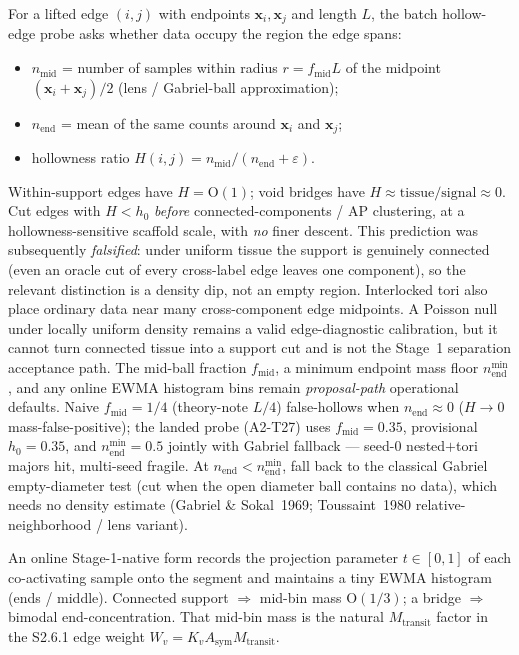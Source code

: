 \documentclass[11pt]{article}
\begin{document}
For a lifted edge $(i,j)$ with endpoints $\mathbf x_i,\mathbf x_j$ and length
$L$, the batch hollow-edge probe asks whether data occupy the region the edge
spans:
\begin{itemize}[leftmargin=1.5em]
  \item $n_{\mathrm{mid}}$ = number of samples within radius
  $r{=}f_{\mathrm{mid}}L$ of the midpoint $(\mathbf x_i+\mathbf x_j)/2$
  (lens / Gabriel-ball approximation);
  \item $n_{\mathrm{end}}$ = mean of the same counts around $\mathbf x_i$ and
  $\mathbf x_j$;
  \item hollowness ratio $H(i,j)=n_{\mathrm{mid}}/(n_{\mathrm{end}}+\varepsilon)$.
\end{itemize}
Within-support edges have $H=\mathrm{O}(1)$; void bridges have
$H\approx\mathrm{tissue}/\mathrm{signal}\approx0$. Cut edges with $H<h_0$
\emph{before} connected-components / AP clustering, at a hollowness-sensitive
scaffold scale, with \emph{no} finer descent. This prediction was subsequently
\emph{falsified}: under uniform tissue the support is genuinely connected
(even an oracle cut of every cross-label edge leaves one component), so the
relevant distinction is a density dip, not an empty region. Interlocked tori
also place ordinary data near many cross-component edge midpoints. A Poisson
null under locally uniform density remains a valid edge-diagnostic calibration,
but it cannot turn connected tissue into a support cut and is not the Stage~1
separation acceptance path. The mid-ball fraction
$f_{\mathrm{mid}}$, a minimum endpoint mass floor $n_{\mathrm{end}}^{\min}$, and
any online EWMA histogram bins remain \emph{proposal-path} operational
defaults. Naive $f_{\mathrm{mid}}{=}1/4$ (theory-note $L/4$) false-hollows when
$n_{\mathrm{end}}\approx 0$ ($H\to 0$ mass-false-positive); the landed probe
(A2-T27) uses $f_{\mathrm{mid}}{=}0.35$, provisional $h_0{=}0.35$, and
$n_{\mathrm{end}}^{\min}{=}0.5$ jointly with Gabriel fallback --- seed-$0$
nested$+$tori majors hit, multi-seed fragile. At
$n_{\mathrm{end}}<n_{\mathrm{end}}^{\min}$, fall back to the classical Gabriel
empty-diameter test (cut when the open diameter ball contains no data), which
needs no density estimate (Gabriel \& Sokal~1969; Toussaint~1980
relative-neighborhood / lens variant).

An online Stage-1-native form records the projection parameter $t\in[0,1]$ of
each co-activating sample onto the segment and maintains a tiny EWMA histogram
(ends / middle). Connected support $\Rightarrow$ mid-bin mass $\mathrm{O}(1/3)$;
a bridge $\Rightarrow$ bimodal end-concentration. That mid-bin mass is the
natural $M_{\mathrm{transit}}$ factor in the S2.6.1 edge weight
$W_v=K_v A_{\mathrm{sym}} M_{\mathrm{transit}}$.
\end{document}
